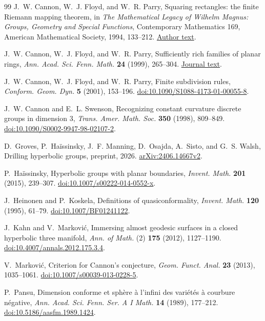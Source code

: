 \begin{thebibliography}{99}
J.~W. Cannon, W.~J. Floyd, and W.~R. Parry,
Squaring rectangles: the finite Riemann mapping theorem,
in \emph{The Mathematical Legacy of Wilhelm Magnus: Groups, Geometry
and Special Functions}, Contemporary Mathematics 169,
American Mathematical Society, 1994, 133--212.
\href{https://personal.math.vt.edu/floyd/research/papers/mageps.pdf}{Author text}.

J.~W. Cannon, W.~J. Floyd, and W.~R. Parry,
Sufficiently rich families of planar rings,
\emph{Ann. Acad. Sci. Fenn. Math.} \textbf{24} (1999), 265--304.
\href{https://www.acadsci.fi/mathematica/Vol24/cannon.pdf}{Journal text}.

J.~W. Cannon, W.~J. Floyd, and W.~R. Parry,
Finite subdivision rules,
\emph{Conform. Geom. Dyn.} \textbf{5} (2001), 153--196.
\href{https://doi.org/10.1090/S1088-4173-01-00055-8}{doi:10.1090/S1088-4173-01-00055-8}.

J.~W. Cannon and E.~L. Swenson,
Recognizing constant curvature discrete groups in dimension 3,
\emph{Trans. Amer. Math. Soc.} \textbf{350} (1998), 809--849.
\href{https://doi.org/10.1090/S0002-9947-98-02107-2}{doi:10.1090/S0002-9947-98-02107-2}.

D.~Groves, P.~Ha\"issinsky, J.~F. Manning, D.~Osajda,
A.~Sisto, and G.~S. Walsh, Drilling hyperbolic groups,
preprint, 2026.
\href{https://arxiv.org/abs/2406.14667v2}{arXiv:2406.14667v2}.

P.~Ha\"issinsky, Hyperbolic groups with planar boundaries,
\emph{Invent. Math.} \textbf{201} (2015), 239--307.
\href{https://doi.org/10.1007/s00222-014-0552-x}{doi:10.1007/s00222-014-0552-x}.

J.~Heinonen and P.~Koskela, Definitions of quasiconformality,
\emph{Invent. Math.} \textbf{120} (1995), 61--79.
\href{https://doi.org/10.1007/BF01241122}{doi:10.1007/BF01241122}.

J.~Kahn and V.~Markovi\'c,
Immersing almost geodesic surfaces in a closed hyperbolic three manifold,
\emph{Ann. of Math.} (2) \textbf{175} (2012), 1127--1190.
\href{https://doi.org/10.4007/annals.2012.175.3.4}{doi:10.4007/annals.2012.175.3.4}.

V.~Markovi\'c, Criterion for Cannon's conjecture,
\emph{Geom. Funct. Anal.} \textbf{23} (2013), 1035--1061.
\href{https://doi.org/10.1007/s00039-013-0228-5}{doi:10.1007/s00039-013-0228-5}.

P.~Pansu, Dimension conforme et sph\`ere \`a l'infini des vari\'et\'es
\`a courbure n\'egative,
\emph{Ann. Acad. Sci. Fenn. Ser. A I Math.} \textbf{14} (1989), 177--212.
\href{https://doi.org/10.5186/aasfm.1989.1424}{doi:10.5186/aasfm.1989.1424}.


\end{thebibliography}
